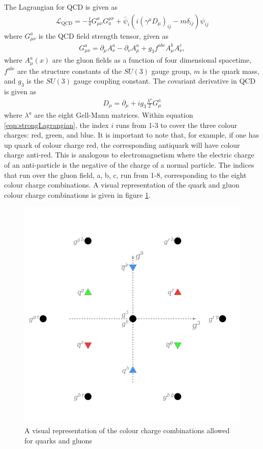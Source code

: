 The Lagrangian for QCD is given as
\begin{align}
\mathcal{L}_{\textrm{QCD}} = - \frac{1}{4}G^{a}_{\mu \nu} G^{\mu \nu}_{a} + \bar{\psi}_{i}\left(i \left(\gamma^{\mu}D_{\mu}\right)_{ij} - m\delta_{ij}\right)\psi_{ij} 
\label{eqn:strongLagrangian}
\end{align}
where $G^{a}_{\mu \nu}$ is the QCD field strength tensor, given as
\begin{align}
G^{a}_{\mu \nu} = \partial_{\mu} A_{\nu}^{a} - \partial_{\nu} A_{\mu}^{a} + g_{3} f^{abc} A_{\mu}^{b} A_{\nu}^{c},
\end{align}
where $A_{\mu}^{a}(x)$ are the gluon fields as a function of four dimensional spacetime, $f^{abc}$ are the structure constants of the $SU(3)$ gauge group, $m$ is the quark mass, and $g_{3}$ is the $SU(3)$ gauge coupling constant.
The covariant derivative in QCD is given as
\begin{align}
D_{\mu} = \partial_{\mu} + ig_{3} \frac{\lambda^{a}}{2} G_{\mu}^{a}
\end{align}
where $\lambda^{a}$ are the eight Gell-Mann  matrices. 
Within equation \ref{eqn:strongLagrangian}, the index $i$ runs from 1-3 to cover the three colour charges: red, green, and blue.
It is important to note that, for example, if one has up quark of colour charge red, the corresponding antiquark will have colour charge anti-red.
This is analogous to electromagnetism where the electric charge of an anti-particle is the negative of the charge of a normal particle.
The indices that run over the gluon field, a, b, c, run from 1-8, corresponding to the eight colour charge combinations.
A visual representation of the quark and gluon colour charge combinations is given in figure \ref{fig:colourCharge}.

\begin{figure}[H] %
   \centering
   \includegraphics[width=.5\textwidth]{Pictures/SU(3).png} 
   \caption{A visual representation of the colour charge combinations allowed for quarks and gluons}
   \label{fig:colourCharge}
\end{figure}

